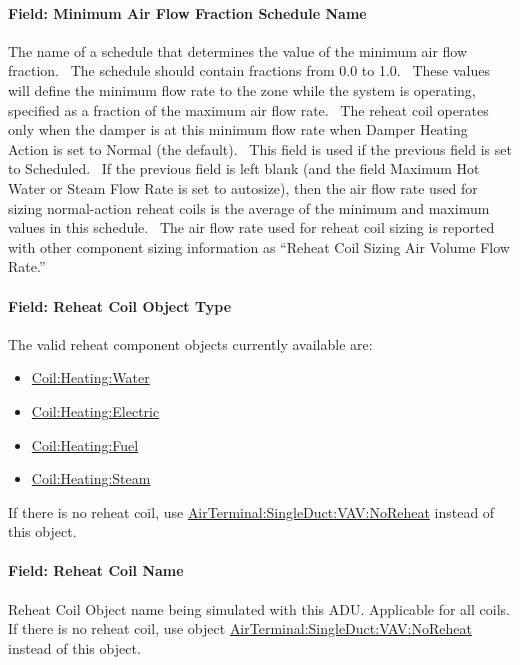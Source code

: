 \paragraph{Field: Minimum Air Flow Fraction Schedule Name}\label{field-minimum-air-flow-fraction-schedule-name}

The name of a schedule that determines the value of the minimum air flow fraction.~ The schedule should contain fractions from 0.0 to 1.0.~ These values will define the minimum flow rate to the zone while the system is operating, specified as a fraction of the maximum air flow rate.~ The reheat coil operates only when the damper is at this minimum flow rate when Damper Heating Action is set to Normal (the default).~ This field is used if the previous field is set to Scheduled.~ If the previous field is left blank (and the field Maximum Hot Water or Steam Flow Rate is set to autosize), then the air flow rate used for sizing normal-action reheat coils is the average of the minimum and maximum values in this schedule.~ The air flow rate used for reheat coil sizing is reported with other component sizing information as ``Reheat Coil Sizing Air Volume Flow Rate.''

\paragraph{Field: Reheat Coil Object Type}\label{field-reheat-coil-object-type-1}

The valid reheat component objects currently available are:

\begin{itemize}
\item
  \hyperref[coilheatingwater]{Coil:Heating:Water}
\item
  \hyperref[coilheatingelectric]{Coil:Heating:Electric}
\item
  \hyperref[coilheatinggas-000]{Coil:Heating:Fuel}
\item
  \hyperref[coilheatingsteam]{Coil:Heating:Steam}
\end{itemize}

If there is no reheat coil, use \hyperref[airterminalsingleductvavnoreheat]{AirTerminal:SingleDuct:VAV:NoReheat} instead of this object.

\paragraph{Field: Reheat Coil Name}\label{field-reheat-coil-name-1}

Reheat Coil Object name being simulated with this ADU. Applicable for all coils. If there is no reheat coil, use object \hyperref[airterminalsingleductvavnoreheat]{AirTerminal:SingleDuct:VAV:NoReheat} instead of this object.

